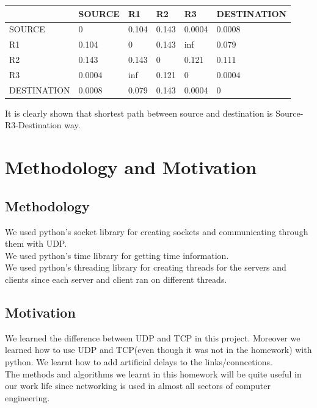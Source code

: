 \documentclass[conference]{IEEEtran}
\begin{document}
\begin{table}[h]
\begin{tabular}{|l|l|l|l|l|l|}
\hline
       & SOURCE  & R1 & R2 & R3 & DESTINATION \\ \hline
SOURCE &   0      &  0.104  & 0.143   &  0.0004  & 0.0008   \\ \hline
R1 &    0.104     & 0   & 0.143   & inf   & 0.079   \\ \hline
R2 &    0.143    & 0.143   &  0  & 0.121    & 0.111  \\ \hline
R3 &    0.0004     & inf   & 0.121  & 0   &    0.0004  \\ \hline
DESTINATION &   0.0008 &  0.079  & 0.143   & 0.0004   & 0     \\ \hline

\end{tabular}
\end{table}

It is clearly shown that shortest path between source and destination is Source-R3-Destination way.\\

\section{Methodology and Motivation}
\subsection{Methodology}
We used python's socket library for creating sockets and communicating through them with UDP. \\
We used python's time library for getting time information. \\
We used python's threading library for creating threads for the servers and clients since each server and client ran on different threads. \\

\subsection{Motivation}
We learned the difference between UDP and TCP in this project. Moreover we learned how to use UDP and TCP(even though it was not in the homework) with python. We learnt how to add artificial delays to the links/conncetions.\\
The methods and algorithms we learnt in this homework will be quite useful in our work life since networking is used in almost all sectors of computer engineering.\\
\end{document}
